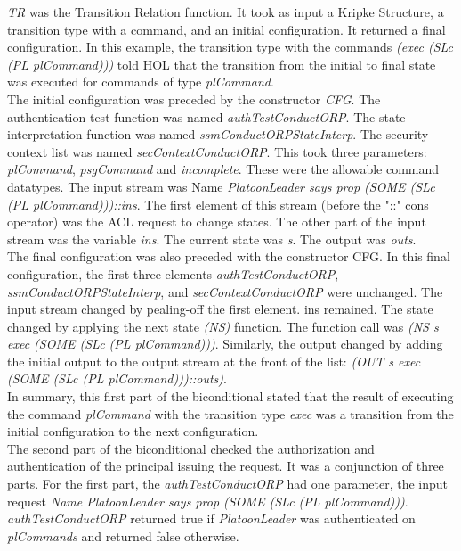 \emph{TR} was the Transition Relation function.  It took as input a Kripke Structure, a transition type with a command, and an initial configuration.  It returned a final configuration.  In this example, the transition type with the commands \emph{(exec (SLc (PL plCommand)))} told HOL that the transition from the initial to final state was executed for commands of type \emph{plCommand}.   \\
  
 The initial configuration was preceded by the constructor \emph{CFG}.  The authentication test function was named \emph{authTestConductORP}.  The state interpretation function was named \emph{ssmConductORPStateInterp}.  The security context list was named \emph{secContextConductORP}.  This took three parameters: \emph{plCommand}, \emph{psgCommand} and \emph{incomplete}.  These were the allowable command datatypes.  The input stream was Name \emph{PlatoonLeader says prop (SOME (SLc (PL plCommand)))::ins}. The first element of this stream (before the "::" cons operator) was the ACL request to change states.  The other part of the input stream was the variable \emph{ins}.  The current state was \emph{s}.  The output was \emph{outs}.  \\
  
 The final configuration was also preceded with the constructor CFG.  In this final configuration, the first three elements \emph{authTestConductORP}, \emph{ssmConductORPStateInterp}, and \emph{secContextConductORP} were unchanged.  The input stream changed by pealing-off the first element.  ins remained.  The state changed by applying the next state \emph{(NS)} function.  The function call was \emph{(NS s exec (SOME (SLc (PL plCommand)))}.  Similarly, the output changed by adding the initial output to the output stream at the front of the list: \emph{(OUT s exec (SOME (SLc (PL plCommand)))::outs)}.  \\
  
In summary, this first part of the biconditional stated that the result of executing the command \emph{plCommand} with the transition type \emph{exec} was a transition from the initial configuration to the next configuration.\\
  
The second part of the biconditional checked the authorization and authentication of the principal issuing the request.  It was a conjunction of three parts.  For the first part, the \emph{authTestConductORP} had one parameter, the input request \emph{Name PlatoonLeader says prop (SOME (SLc (PL plCommand)))}.  \emph{authTestConductORP} returned true if \emph{PlatoonLeader} was authenticated on \emph{plCommands} and returned false otherwise.  \\

